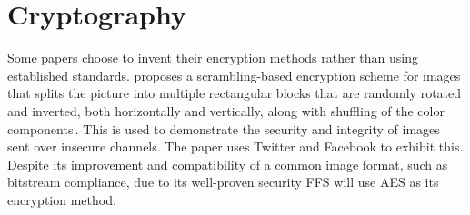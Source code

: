 \section{Cryptography}
\label{sec:rel_crypto}
Some papers choose to invent their encryption methods rather than using established standards. \citeauthor{chumanEncryptionThenCompressionSystemsUsing2019} proposes a \mbox{scrambling-based} encryption scheme for images that splits the picture into multiple rectangular blocks that are randomly rotated and inverted, both horizontally and vertically, along with shuffling of the color components\,\cite{chumanEncryptionThenCompressionSystemsUsing2019}. This is used to demonstrate the security and integrity of images sent over insecure channels. The paper uses Twitter and Facebook to exhibit this. Despite its improvement and compatibility of a common image format, such as bitstream compliance, due to its \mbox{well-proven} security \gls{FFS} will use \gls{AES} as its encryption method. 